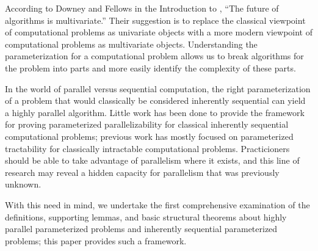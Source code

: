 %
%
%
According to Downey and Fellows in the Introduction to \autocite{df13}, ``The future of algorithms is multivariate.''
Their suggestion is to replace the classical viewpoint of computational problems as univariate objects with a more modern viewpoint of computational problems as multivariate objects.
Understanding the parameterization for a computational problem allows us to break algorithms for the problem into parts and more easily identify the complexity of these parts.

%
%
%
In the world of parallel versus sequential computation, the right parameterization of a problem that would classically be considered inherently sequential can yield a highly parallel algorithm.
Little work has been done to provide the framework for proving parameterized parallelizability for classical inherently sequential computational problems; previous work has mostly focused on parameterized tractability for classically intractable computational problems.
Practicioners should be able to take advantage of parallelism where it exists, and this line of research may reveal a hidden capacity for parallelism that was previously unknown.

%
%
%
With this need in mind, we undertake the first comprehensive examination of the definitions, supporting lemmas, and basic structural theorems about highly parallel parameterized problems and inherently sequential parameterized problems;
%
%
%
this paper provides such a framework.

